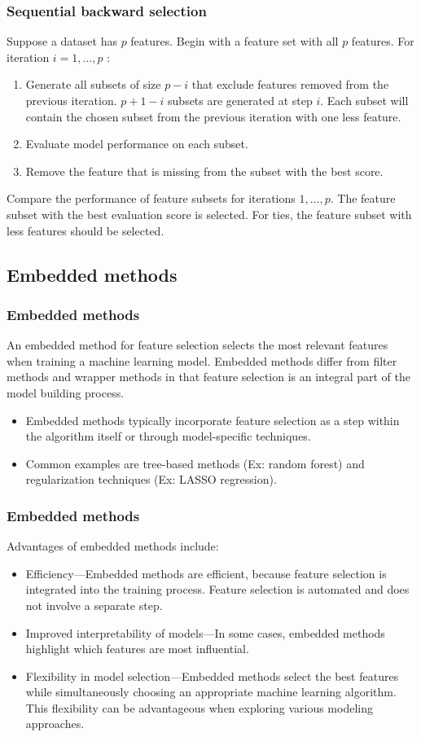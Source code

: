 \documentclass[8pt,dvipsnames]{beamer}
\begin{document}
\begin{frame}
    \frametitle{Sequential backward selection}
    Suppose a dataset has \(p\) features. Begin with a feature set with all \(p\) features. For iteration \(i=1, \ldots, p\) :
    \begin{enumerate}
        \item Generate all subsets of size \(p-i\) that exclude features removed from the previous iteration. \(p+1-i\) subsets are generated at
              step \(i\). Each subset will contain the chosen subset from the previous iteration with one less feature.
        \item Evaluate model performance on each subset.
        \item Remove the feature that is missing from the subset with the best score.
    \end{enumerate}
    Compare the performance of feature subsets for iterations \(1, \ldots, p\). The feature subset with the best evaluation score is selected. For
    ties, the feature subset with less features should be selected.
\end{frame}

\subsection{Embedded methods}

\begin{frame}
    \frametitle{Embedded methods}
    An embedded method for feature selection selects the most relevant features when training a machine learning model. Embedded methods differ from filter methods and wrapper methods in that feature selection is an integral part of the model building process.
    \begin{itemize}
        \item Embedded methods typically incorporate feature selection as a step within the algorithm itself or through model-specific techniques.
        \item Common examples are tree-based methods (Ex: random forest) and regularization techniques (Ex: LASSO regression).
    \end{itemize}

\end{frame}

\begin{frame}
    \frametitle{Embedded methods}
    Advantages of embedded methods include:
    \begin{itemize}
        \item Efficiency—Embedded methods are efficient, because feature selection is integrated into the training process. Feature selection is automated and does not involve a separate step.
        \item Improved interpretability of models—In some cases, embedded methods highlight which features are most influential.
        \item Flexibility in model selection—Embedded methods select the best features while simultaneously choosing an appropriate machine learning algorithm. This flexibility can be advantageous when exploring various modeling approaches.
    \end{itemize}
\end{frame}
\end{document}
